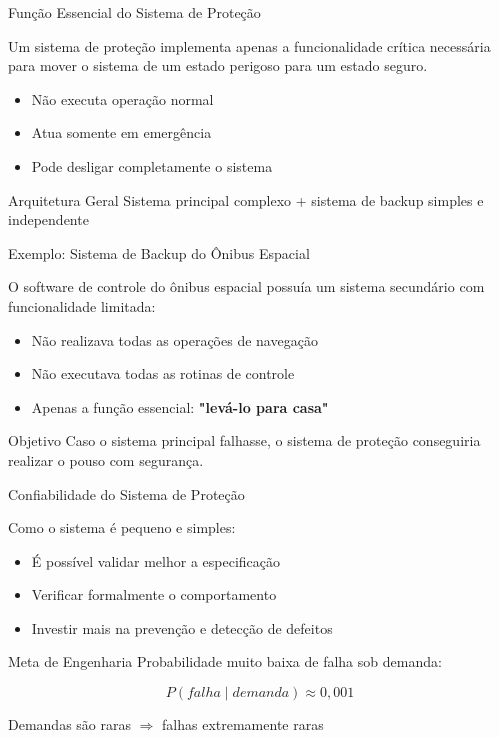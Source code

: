 \documentclass[9pt]{beamer}
\begin{document}
\begin{frame}{Função Essencial do Sistema de Proteção}
\small

Um sistema de proteção implementa apenas a funcionalidade crítica
necessária para mover o sistema de um estado perigoso para um estado seguro.

\begin{itemize}
    \item Não executa operação normal
    \item Atua somente em emergência
    \item Pode desligar completamente o sistema
\end{itemize}

\begin{block}{Arquitetura Geral}
Sistema principal complexo + sistema de backup simples e independente
\end{block}

\end{frame}
\begin{frame}{Exemplo: Sistema de Backup do Ônibus Espacial}
\small

O software de controle do ônibus espacial possuía um sistema secundário
com funcionalidade limitada:

\begin{itemize}
    \item Não realizava todas as operações de navegação
    \item Não executava todas as rotinas de controle
    \item Apenas a função essencial: \textbf{"levá-lo para casa"}
\end{itemize}

\begin{alertblock}{Objetivo}
Caso o sistema principal falhasse, o sistema de proteção conseguiria
realizar o pouso com segurança.
\end{alertblock}

\end{frame}
\begin{frame}{Confiabilidade do Sistema de Proteção}
\small

Como o sistema é pequeno e simples:

\begin{itemize}
    \item É possível validar melhor a especificação
    \item Verificar formalmente o comportamento
    \item Investir mais na prevenção e detecção de defeitos
\end{itemize}

\begin{block}{Meta de Engenharia}
Probabilidade muito baixa de falha sob demanda:

\[
P(falha \mid demanda) \approx 0{,}001
\]

Demandas são raras $\Rightarrow$ falhas extremamente raras
\end{block}

\end{frame}
\end{document}
